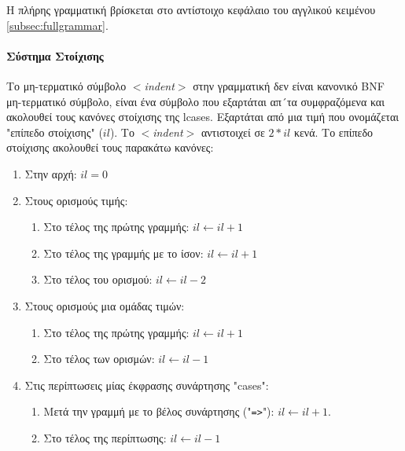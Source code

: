 \documentclass[diploma]{softlab-thesis}
\begin{document}
Η πλήρης γραμματική βρίσκεται στο αντίστοιχο κεφάλαιο του αγγλικού κειμένου
\ref{subsec:fullgrammar}.

\paragraph{Σύστημα Στοίχισης}

Το μη-τερματικό σύμβολο \textit{$<$indent$>$} στην γραμματική δεν είναι
κανονικό BNF μη-τερματικό σύμβολο, είναι ένα σύμβολο που εξαρτάται απ´τα
συμφραζόμενα και ακολουθεί τους κανόνες στοίχισης της lcases.
Εξαρτάται από μια τιμή που ονομάζεται "επίπεδο στοίχισης" ($il$).
Το \textit{$<$indent$>$} αντιστοιχεί σε $2*il$ κενά. Το επίπεδο στοίχισης
ακολουθεί τους παρακάτω κανόνες:

\begin{enumerate}

\item
Στην αρχή: $il = 0$

\item
Στους ορισμούς τιμής:
  \begin{enumerate}

  \item
  Στο τέλος της πρώτης γραμμής: $il \leftarrow il + 1$

  \item
  Στο τέλος της γραμμής με το ίσον: $il \leftarrow il + 1$

  \item
  Στο τέλος του ορισμού: $il \leftarrow il - 2$
  \end{enumerate}

\item
Στους ορισμούς μια ομάδας τιμών:
  \begin{enumerate}

  \item
  Στο τέλος της πρώτης γραμμής: $il \leftarrow il + 1$

  \item
  Στο τέλος των ορισμών: $il \leftarrow il - 1$
  \end{enumerate}

\item
Στις περίπτωσεις μίας έκφρασης συνάρτησης "cases":
  \begin{enumerate}

  \item
  Μετά την γραμμή με το βέλος συνάρτησης ("\verb|=>|"): $il \leftarrow il + 1$.

  \item
  Στο τέλος της περίπτωσης: $il \leftarrow il - 1$
  \end{enumerate}


\end{enumerate}
\end{document}
